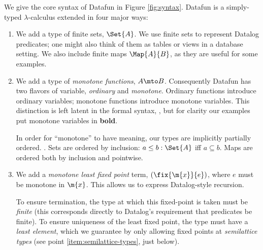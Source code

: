 We give the core syntax of Datafun in Figure \ref{fig:syntax}. Datafun is a
simply-typed $\lambda$-calculus extended in four major ways:

\begin{enumerate}
\item We add a type of finite sets, $\Set{A}$. We use finite sets to represent
  Datalog predicates; one might also think of them as tables or views in a
  database setting. We also include finite maps $\Map{A}{B}$, as they are useful
  for some examples.


\item We add a type of \emph{monotone functions}, $A \mto B$. Consequently
  Datafun has two flavors of variable, \emph{ordinary} and \emph{monotone}.
  Ordinary functions introduce ordinary variables; monotone functions introduce
  monotone variables. This distinction is left latent in the formal syntax,
  , but for clarity our examples put monotone variables in
  \textbf{bold}.

  In order for ``monotone'' to have meaning, our types are implicitly partially
  ordered. . Sets are ordered by inclusion: $a \le b :
  \Set{A}$ iff $a \subseteq b$. Maps are ordered both by inclusion and
  pointwise.

\item We add a \emph{monotone least fixed point} term, $(\fix{\m{x}}{e})$,
  where $e$ must be monotone in $\m{x}$. This allows us to express
  Datalog-style recursion.


  To ensure termination, the type at which this fixed-point is taken must be
  \emph{finite} (this corresponds directly to Datalog's requirement that
  predicates be finite). To ensure uniqueness of the least fixed point, the type
  must have a \emph{least element}, which we guarantee by only allowing fixed
  points at \emph{semilattice types} (see point \ref{item:semilattice-types},
  just below).


\end{enumerate}
